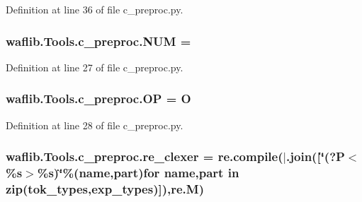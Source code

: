 Definition at line 36 of file c\+\_\+preproc.\+py.

\subsubsection[{\texorpdfstring{N\+UM}{NUM}}]{ waflib.\+Tools.\+c\+\_\+preproc.\+N\+UM = \textquotesingle{}}\hypertarget{namespacewaflib_1_1_tools_1_1c__preproc_ad9e180042602406afc7750bb8e5b366b}{}\label{namespacewaflib_1_1_tools_1_1c__preproc_ad9e180042602406afc7750bb8e5b366b}


Definition at line 27 of file c\+\_\+preproc.\+py.

\subsubsection[{\texorpdfstring{OP}{OP}}]{ waflib.\+Tools.\+c\+\_\+preproc.\+OP = \textquotesingle{}O\textquotesingle{}}\hypertarget{namespacewaflib_1_1_tools_1_1c__preproc_ada824040bf51687d04d514a2cbe2c6c7}{}\label{namespacewaflib_1_1_tools_1_1c__preproc_ada824040bf51687d04d514a2cbe2c6c7}


Definition at line 28 of file c\+\_\+preproc.\+py.

\subsubsection[{\texorpdfstring{re\+\_\+clexer}{re_clexer}}]{\setlength{\rightskip}{0pt plus 5cm}waflib.\+Tools.\+c\+\_\+preproc.\+re\+\_\+clexer = re.\+compile(\textquotesingle{}$\vert$\textquotesingle{}.join(\mbox{[}\char`\"{}(?P$<$\%{\bf s}$>$\%{\bf s})\char`\"{}\%(name,part){\bf for} {\bf name},part {\bf in} zip({\bf tok\+\_\+types},{\bf exp\+\_\+types})\mbox{]}),{\bf re.\+M})}\hypertarget{namespacewaflib_1_1_tools_1_1c__preproc_a720c66d66734fd4885d7e781d591c04c}{}\label{namespacewaflib_1_1_tools_1_1c__preproc_a720c66d66734fd4885d7e781d591c04c}


